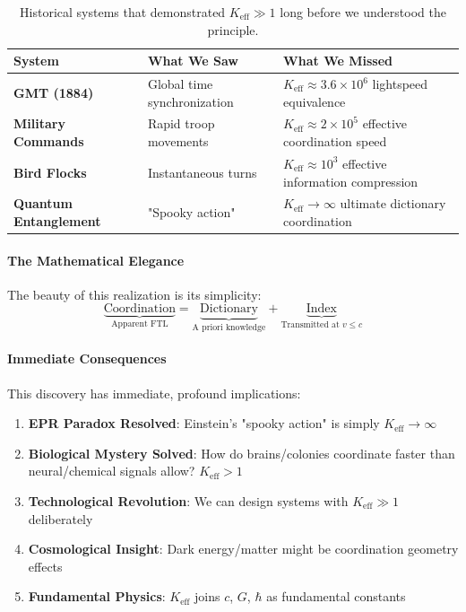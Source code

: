 \documentclass[11pt,a4paper]{article}
\begin{document}
	\begin{table}[htbp]
		\centering
		\begin{tabular}{p{}p{}p{}}
			\toprule
			\textbf{System} & \textbf{What We Saw} & \textbf{What We Missed} \\
			\midrule
			\textbf{GMT (1884)} & Global time synchronization & $K_{\mathrm{eff}} \approx 3.6\times10^6$ lightspeed equivalence \\
			\textbf{Military Commands} & Rapid troop movements & $K_{\mathrm{eff}} \approx 2\times10^5$ effective coordination speed \\
			\textbf{Bird Flocks} & Instantaneous turns & $K_{\mathrm{eff}} \approx 10^3$ effective information compression \\
			\textbf{Quantum Entanglement} & "Spooky action" & $K_{\mathrm{eff}} \to \infty$ ultimate dictionary coordination \\
			\bottomrule
		\end{tabular}
		\caption{Historical systems that demonstrated $K_{\mathrm{eff}} \gg 1$ long before we understood the principle.}
	\end{table}
	
	\paragraph{The Mathematical Elegance}
	The beauty of this realization is its simplicity:
	\begin{equation}
		\underbrace{\text{Coordination}}_{\text{Apparent FTL}} = 
		\underbrace{\text{Dictionary}}_{\text{A priori knowledge}} + 
		\underbrace{\text{Index}}_{\text{Transmitted at } v \leq c}
	\end{equation}
	
	\paragraph{Immediate Consequences}
	This discovery has immediate, profound implications:
	
	\begin{enumerate}
		\item \textbf{EPR Paradox Resolved}: Einstein's "spooky action" is simply $K_{\mathrm{eff}} \to \infty$
		
		\item \textbf{Biological Mystery Solved}: How do brains/colonies coordinate faster than neural/chemical signals allow? $K_{\mathrm{eff}} > 1$
		
		\item \textbf{Technological Revolution}: We can design systems with $K_{\mathrm{eff}} \gg 1$ deliberately
		
		\item \textbf{Cosmological Insight}: Dark energy/matter might be coordination geometry effects
		
		\item \textbf{Fundamental Physics}: $K_{\mathrm{eff}}$ joins $c$, $G$, $\hbar$ as fundamental constants
	\end{enumerate}
	
\end{document}
